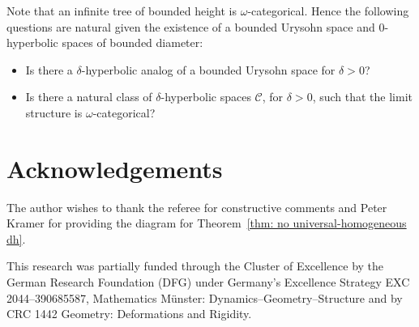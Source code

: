 \documentclass{amsart}
\renewcommand{\d}{\delta}
\newcommand{\C}{\mathcal{C}}
\begin{document}
Note that an infinite tree of bounded height is $\omega$-categorical. Hence the following questions are natural given the existence of a bounded Urysohn space and $0$-hyperbolic spaces of bounded diameter:

\begin{itemize}
\item Is there a $\d$-hyperbolic analog of a bounded Urysohn space for $\d> 0$?

\item Is there a natural class of $\d$-hyperbolic spaces $\C$, for $\d> 0$, such that the limit structure is $\omega$-categorical?
\end{itemize}




\section{Acknowledgements}

The author wishes to thank the referee for constructive comments and Peter Kramer for providing the diagram for Theorem~\ref{thm: no universal-homogeneous dh}.
 
This research was partially funded through the Cluster of Excellence by the
German Research Foundation (DFG) under Germany’s Excellence Strategy EXC
2044–390685587, Mathematics M\"unster: Dynamics–Geometry–Structure and by
CRC 1442 Geometry: Deformations and Rigidity.
\end{document}
